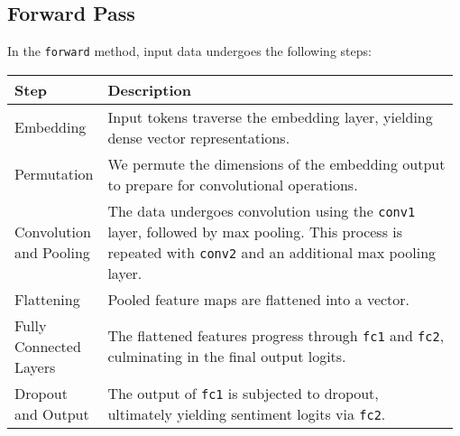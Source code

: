 \subsection{Forward Pass}
\vspace{-1em}
In the \texttt{forward} method, input data undergoes the following steps:

\begin{table}[!ht]
    \centering
        \begin{tabular}{|p{0.15\linewidth}|p{0.83\linewidth}|}
            \hline
            Step & Description \\
            \hline
            Embedding & Input tokens traverse the embedding layer, yielding dense vector representations.\\
            \hline
            Permutation & We permute the dimensions of the embedding output to prepare for convolutional operations. \\
            \hline
            Convolution and Pooling &  The data undergoes convolution using the \texttt{conv1} layer, followed by max pooling. This process is repeated with \texttt{conv2} and an additional max pooling layer. \\
            \hline
            Flattening & Pooled feature maps are flattened into a vector. \\
            \hline
            Fully Connected Layers &  The flattened features progress through \texttt{fc1} and \texttt{fc2}, culminating in the final output logits.\\
            \hline
            Dropout and Output & The output of \texttt{fc1} is subjected to dropout, ultimately yielding sentiment logits via \texttt{fc2}.\\
            \hline
        \end{tabular}
\end{table}

\vspace{-1em}
